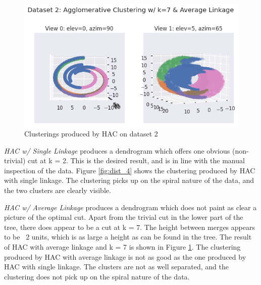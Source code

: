 \documentclass[12pt]{article}
\begin{document}
\begin{figure}[ht]
  \centering
  \includegraphics[width=0.75\linewidth]{ggg.png}
  \caption{Clusterings produced by HAC on dataset 2}
  \label{fig:dist_5}
\end{figure}

\textit{HAC w/ Single Linkage} produces a dendrogram which offers one obvious
(non-trivial) cut at k = 2. This is the desired result, and is in line with the
manual inspection of the data. Figure \ref{fig:dist_4} shows the clustering produced
by HAC with single linkage. The clustering picks up on the spiral nature of the data,
and the two clusters are clearly visible. 

\textit{HAC w/ Average Linkage} produces a dendrogram which does not paint as 
clear a picture of the optimal cut. Apart from the trivial cut in the lower part
of the tree, there does appear to be a cut at k = 7. The height between merges
appears to be ~2 units, which is as large a height as can be found in the tree. 
The result of HAC with average linkage and k = 7 is shown in Figure \ref{fig:dist_5}.
The clustering produced by HAC with average linkage is not as good as the one produced
by HAC with single linkage. The clusters are not as well separated, and the clustering
does not pick up on the spiral nature of the data.
\end{document}
